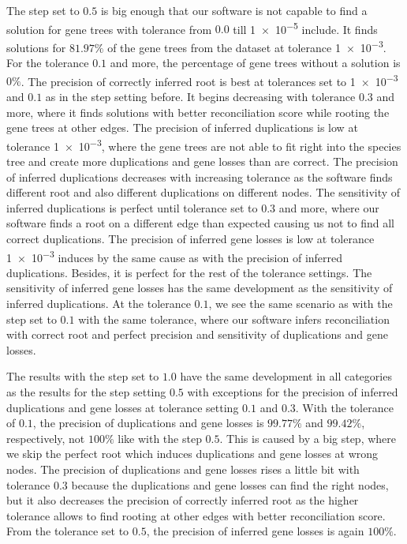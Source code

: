 The step set to $0.5$ is big enough that our software is not capable to find a solution for gene trees with tolerance from $0.0$ till \num{1e-5} include. It finds solutions for $81.97\%$ of the gene trees from the dataset at tolerance \num{1e-3}. For the tolerance $0.1$ and more, the percentage of gene trees without a solution is $0\%$. The precision of correctly inferred root is best at tolerances set to \num{1e-3} and $0.1$ as in the step setting before. It begins decreasing with tolerance $0.3$ and more, where it finds solutions with better reconciliation score while rooting the gene trees at other edges. The precision of inferred duplications is low at tolerance \num{1e-3}, where the gene trees are not able to fit right into the species tree and create more duplications and gene losses than are correct. The precision of inferred duplications decreases with increasing tolerance as the software finds different root and also different duplications on different nodes. The sensitivity of inferred duplications is perfect until tolerance set to $0.3$ and more, where our software finds a root on a different edge than expected causing us not to find all correct duplications. The precision of inferred gene losses is low at tolerance \num{1e-3} induces by the same cause as with the precision of inferred duplications. Besides, it is perfect for the rest of the tolerance settings. The sensitivity of inferred gene losses has the same development as the sensitivity of inferred duplications. At the tolerance $0.1$, we see the same scenario as with the step set to $0.1$ with the same tolerance, where our software infers reconciliation with correct root and perfect precision and sensitivity of duplications and gene losses.

The results with the step set to $1.0$ have the same development in all categories as the results for the step setting $0.5$ with exceptions for the precision of inferred duplications and gene losses at tolerance setting $0.1$ and $0.3$. With the tolerance of $0.1$, the precision of duplications and gene losses is $99.77\%$ and $99.42\%$, respectively, not $100\%$ like with the step $0.5$. This is caused by a big step, where we skip the perfect root which induces duplications and gene losses at wrong nodes. The precision of duplications and gene losses rises a little bit with tolerance $0.3$ because the duplications and gene losses can find the right nodes, but it also decreases the precision of correctly inferred root as the higher tolerance allows to find rooting at other edges with better reconciliation score. From the tolerance set to $0.5$, the precision of inferred gene losses is again $100\%$. 

